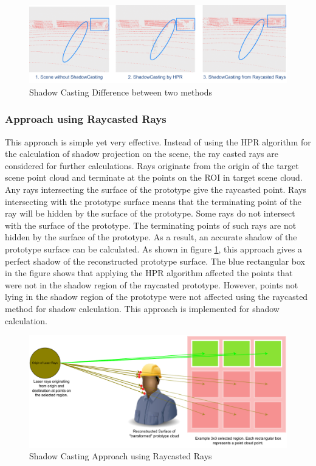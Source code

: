 \begin{figure}[htbp]
    \centering
    \includegraphics[width=0.9\linewidth]{97_graphics/concepts/shadow_casting_difference.pdf}
    \caption{Shadow Casting Difference between two methods}
    \label{fig:concept-shadow_casting_difference}
\end{figure}


\subsubsection{Approach using Raycasted Rays}
This approach is simple yet very effective. Instead of using the HPR algorithm for the calculation of shadow projection on the scene, the ray casted rays are considered for further calculations. Rays originate from the origin of the target scene point cloud and terminate at the points on the ROI in target scene cloud. Any rays intersecting the surface of the prototype give the raycasted point. Rays intersecting with the prototype surface means that the terminating point of the ray will be hidden by the surface of the prototype. Some rays do not intersect with the surface of the prototype. The terminating points of such rays are not hidden by the surface of the prototype. As a result, an accurate shadow of the prototype surface can be calculated. As shown in figure \ref{fig:concept-shadow_casting_difference}, this approach gives a perfect shadow of the reconstructed prototype surface. The blue rectangular box in the figure shows that applying the HPR algorithm affected the points that were not in the shadow region of the raycasted prototype. However, points not lying in the shadow region of the prototype were not affected using the raycasted method for shadow calculation. This approach is implemented for shadow calculation.
\begin{figure}[htbp]
    \centering
    \includegraphics[width=0.9\linewidth]{97_graphics/concepts/shadow_casting_by_raycast_method.pdf}
    \caption{Shadow Casting Approach using Raycasted Rays}
    \label{fig:concept-shadow_casting_by_raycast_method}
\end{figure}

